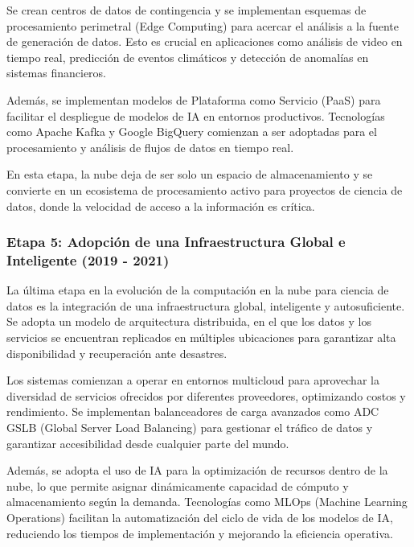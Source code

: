 {                Se crean centros de datos de contingencia y se implementan esquemas de procesamiento perimetral (Edge Computing) para acercar el an{\'a}lisis a la fuente de generaci{\'o}n de datos. Esto es crucial en aplicaciones como an{\'a}lisis de video en tiempo real, predicci{\'o}n de eventos clim{\'a}ticos y detecci{\'o}n de anomal{\'i}as en sistemas financieros.
            
                Adem{\'a}s, se implementan modelos de Plataforma como Servicio (PaaS) para facilitar el despliegue de modelos de IA en entornos productivos. Tecnolog{\'i}as como Apache Kafka y Google BigQuery comienzan a ser adoptadas para el procesamiento y an{\'a}lisis de flujos de datos en tiempo real.
            
                En esta etapa, la nube deja de ser solo un espacio de almacenamiento y se convierte en un ecosistema de procesamiento activo para proyectos de ciencia de datos, donde la velocidad de acceso a la informaci{\'o}n es cr{\'i}tica.
            
            \subsubsection{Etapa 5: Adopci{\'o}n de una Infraestructura Global e Inteligente (2019 - 2021)}
                La {\'u}ltima etapa en la evoluci{\'o}n de la computaci{\'o}n en la nube para ciencia de datos es la integraci{\'o}n de una infraestructura global, inteligente y autosuficiente. Se adopta un modelo de arquitectura distribuida, en el que los datos y los servicios se encuentran replicados en m{\'u}ltiples ubicaciones para garantizar alta disponibilidad y recuperaci{\'o}n ante desastres.
            
                Los sistemas comienzan a operar en entornos multicloud para aprovechar la diversidad de servicios ofrecidos por diferentes proveedores, optimizando costos y rendimiento. Se implementan balanceadores de carga avanzados como ADC GSLB (Global Server Load Balancing) para gestionar el tr{\'a}fico de datos y garantizar accesibilidad desde cualquier parte del mundo.
            
                Adem{\'a}s, se adopta el uso de IA para la optimizaci{\'o}n de recursos dentro de la nube, lo que permite asignar din{\'a}micamente capacidad de c{\'o}mputo y almacenamiento seg{\'u}n la demanda. Tecnolog{\'i}as como MLOps (Machine Learning Operations) facilitan la automatizaci{\'o}n del ciclo de vida de los modelos de IA, reduciendo los tiempos de implementaci{\'o}n y mejorando la eficiencia operativa.
            
}
